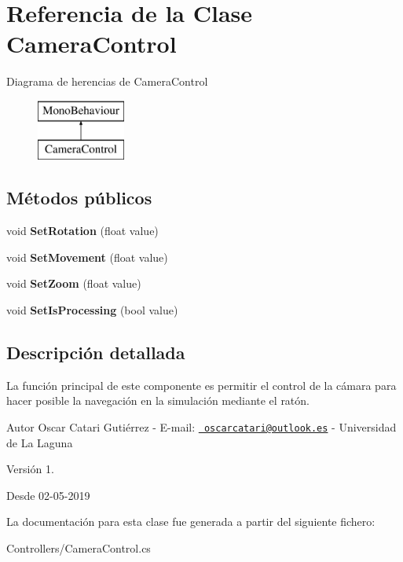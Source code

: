 \hypertarget{class_camera_control}{}\section{Referencia de la Clase Camera\+Control}
\label{class_camera_control}
Diagrama de herencias de Camera\+Control\begin{figure}[H]
\begin{center}
\leavevmode
\includegraphics[height=2.000000cm]{class_camera_control}
\end{center}
\end{figure}
\subsection*{Métodos públicos}
\begin{DoxyCompactItemize}
\item 
\mbox{\label{class_camera_control_a7dfdd3783b057fd9941f20a634b95b03}} 
void {\bfseries Set\+Rotation} (float value)
\item 
\mbox{\label{class_camera_control_a2307b3b28fd8f9f40248fc0441f916de}} 
void {\bfseries Set\+Movement} (float value)
\item 
\mbox{\label{class_camera_control_a6c7f7816a4bff734280e19f65ef9df87}} 
void {\bfseries Set\+Zoom} (float value)
\item 
\mbox{\label{class_camera_control_a715690bfd42a136da5b5880debb2e420}} 
void {\bfseries Set\+Is\+Processing} (bool value)
\end{DoxyCompactItemize}


\subsection{Descripción detallada}
La función principal de este componente es permitir el control de la cámara para hacer posible la navegación en la simulación mediante el ratón. \begin{DoxyAuthor}{Autor}
Oscar Catari Gutiérrez -\/ E-\/mail\+: \href{mailto:oscarcatari@outlook.es}{\texttt{ oscarcatari@outlook.\+es}} -\/ Universidad de La Laguna 
\end{DoxyAuthor}
\begin{DoxyVersion}{Versión}
1. 
\end{DoxyVersion}
\begin{DoxySince}{Desde}
02-\/05-\/2019 
\end{DoxySince}


La documentación para esta clase fue generada a partir del siguiente fichero\+:\begin{DoxyCompactItemize}
\item 
Controllers/Camera\+Control.\+cs\end{DoxyCompactItemize}
